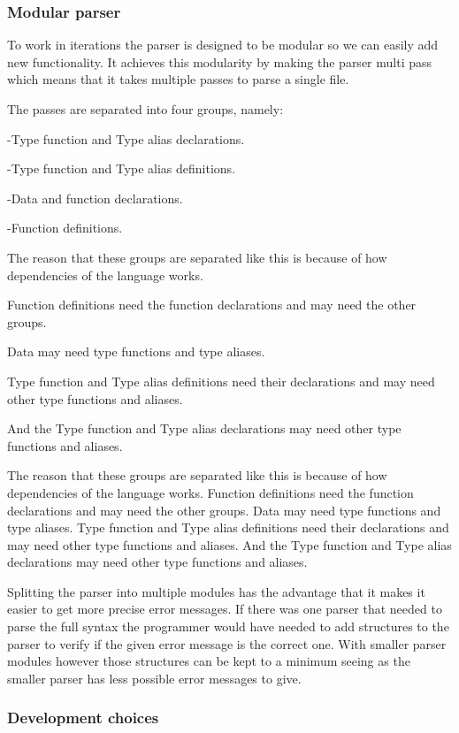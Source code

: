\subsubsection{Modular parser}

To work in iterations the parser is designed to be modular so we can easily add new functionality. It achieves this modularity by making the parser multi pass which means that it takes multiple passes to parse a single file.

The passes are separated into four groups, namely:

-Type function and Type alias declarations.

-Type function and Type alias definitions.

-Data and function declarations.

-Function definitions.

The reason that these groups are separated like this is because of how dependencies of the language works.

Function definitions need the function declarations and may need the other groups.

Data may need type functions and type aliases.

Type function and Type alias definitions need their declarations and may need other type functions and aliases.

And the Type function and Type alias declarations may need other type functions and aliases.

The reason that these groups are separated like this is because of how dependencies of the language works.
Function definitions need the function declarations and may need the other groups.
Data may need type functions and type aliases.
Type function and Type alias definitions need their declarations and may need other type functions and aliases.
And the Type function and Type alias declarations may need other type functions and aliases.

Splitting the parser into multiple modules has the advantage that it makes it easier to get more precise error messages. If there was one parser that needed to parse the full syntax the programmer would have needed to add structures to the parser to verify if the given error message is the correct one. With smaller parser modules however those structures can be kept to a minimum seeing as the smaller parser has less possible error messages to give. 

\subsubsection{Development choices}

